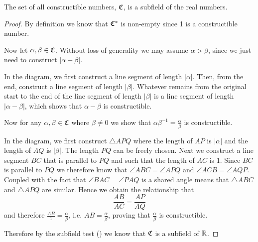 \begin{theorem}\label{thrm-constructible-numbers-is-subfield-of-real-numbers}
    The set of all constructible numbers, $\mathfrak{C}$, is a subfield of the real numbers.
\end{theorem}
\begin{proof}
    By definition we know that $\mathfrak{C}^\ast$ is non-empty since 1 is a constructible number.

    Now let $\alpha, \beta \in \mathfrak{C}$. Without loss of generality we may assume $\alpha > \beta$, since we just need to construct $|\alpha - \beta|$.
    \begin{figure}[H]
        \centering
    \end{figure}
    In the diagram, we first construct a line segment of length $|\alpha|$. Then, from the end, construct a line segment of length $|\beta|$. Whatever remains from the original start to the end of the line segment of length $|\beta|$ is a line segment of length $|\alpha - \beta|$, which shows that $\alpha - \beta$ is constructible.

    Now for any $\alpha,\beta \in \mathfrak{C}$ where $\beta \neq 0$ we show that $\alpha\beta^{-1} = \frac\alpha\beta$ is constructible.
    \begin{figure}[H]
        \centering
    \end{figure}
    In the diagram, we first construct $\triangle APQ$ where the length of $AP$ is $|\alpha|$ and the length of $AQ$ is $|\beta|$. The length $PQ$ can be freely chosen. Next we construct a line segment $BC$ that is parallel to $PQ$ and such that the length of $AC$ is 1. Since $BC$ is parallel to $PQ$ we therefore know that $\angle ABC = \angle APQ$ and $\angle ACB = \angle AQP$. Coupled with the fact that $\angle BAC = \angle PAQ$ is a shared angle means that $\triangle ABC$ and $\triangle APQ$ are similar. Hence we obtain the relationship that
    \[
        \frac{AB}{AC} = \frac{AP}{AQ}
    \]
    and therefore $\frac{AB}{1} = \frac{\alpha}{\beta}$, i.e. $AB = \frac\alpha\beta$, proving that $\frac\alpha\beta$ is constructible.

    Therefore by the subfield test () we know that $\mathfrak{C}$ is a subfield of $\mathbb{R}$.
\end{proof}

